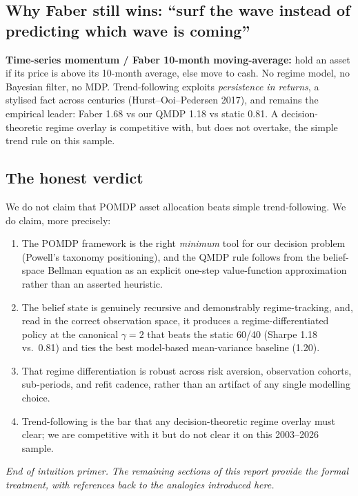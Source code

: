 \documentclass[11pt]{article}
\theoremstyle{plain1}
\theoremstyle{definition1}
\newcommand{\1}{\mathbf{1}}
\begin{document}
\subsection{Why Faber still wins: ``surf the wave instead of predicting which wave is coming''}

\textbf{Time-series momentum / Faber 10-month moving-average:} hold an asset if its price is above its 10-month average, else move to cash. No regime model, no Bayesian filter, no MDP. Trend-following exploits \emph{persistence in returns}, a stylised fact across centuries (Hurst--Ooi--Pedersen 2017), and remains the empirical leader: Faber 1.68 vs our QMDP 1.18 vs static 0.81. A decision-theoretic regime overlay is competitive with, but does not overtake, the simple trend rule on this sample.

\subsection{The honest verdict}

We do not claim that POMDP asset allocation beats simple trend-following. We do claim, more precisely:
\begin{enumerate}[leftmargin=1.5em,itemsep=2pt]
  \item The POMDP framework is the right \emph{minimum} tool for our decision problem (Powell's taxonomy positioning), and the QMDP rule follows from the belief-space Bellman equation as an explicit one-step value-function approximation rather than an asserted heuristic.
  \item The belief state is genuinely recursive and demonstrably regime-tracking, and, read in the correct observation space, it produces a regime-differentiated policy at the canonical $\gamma{=}2$ that beats the static 60/40 (Sharpe 1.18 vs.\ 0.81) and ties the best model-based mean-variance baseline (1.20).
  \item That regime differentiation is robust across risk aversion, observation cohorts, sub-periods, and refit cadence, rather than an artifact of any single modelling choice.
  \item Trend-following is the bar that any decision-theoretic regime overlay must clear; we are competitive with it but do not clear it on this 2003--2026 sample.
\end{enumerate}

\textit{End of intuition primer. The remaining sections of this report provide the formal treatment, with references back to the analogies introduced here.}
\end{document}
